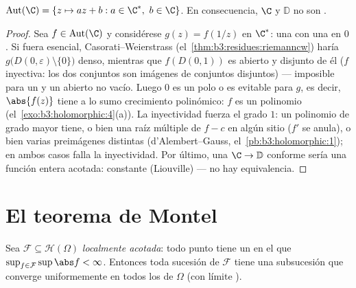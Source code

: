 \begin{theorem}
\label{thm:b3:conformal:autplane}
$\operatorname{Aut}(\C) = \{z \mapsto az + b : a \in \C^*,\ b
\in \C\}$. En consecuencia, $\C$ y $\mathbb D$ no son
.
\end{theorem}

\begin{proof}
Sea $f \in \operatorname{Aut}(\C)$ y considérese $g(z) =
f(1/z)$ en $\C^*$: una  con una  en $0$. Si fuera esencial, Casorati--Weierstrass
(el~\cref{thm:b3:residues:riemanncw}) haría
$g\bigl(D(0,\varepsilon)\setminus\{0\}\bigr)$ denso, mientras que
$f(D(0, 1))$ es abierto y disjunto de él ($f$ inyectiva: los dos
conjuntos son imágenes de conjuntos disjuntos) --- imposible para un
 y un
abierto no vacío. Luego $0$ es un
polo o es evitable para $g$, es decir, $\abs{f(z)}$ tiene a lo sumo
crecimiento polinómico: $f$ es un polinomio
(el~\cref{exo:b3:holomorphic:4}(a)). La inyectividad fuerza el grado
$1$: un polinomio de grado mayor tiene, o bien una raíz múltiple de
$f - c$ en algún sitio ($f'$ se anula), o bien varias preimágenes
distintas (d'Alembert--Gauss, el~\cref{pb:b3:holomorphic:1}); en ambos
casos falla la inyectividad. Por último, una $\C \to
\mathbb D$ conforme sería una función entera acotada: constante
(Liouville) --- no hay equivalencia.
\end{proof}

\section{El teorema de Montel}

\begin{theorem}[Montel]\label{thm:b3:conformal:montel}
Sea $\mathcal F \subseteq \mathcal H(\Omega)$ \emph{localmente acotada}:
todo punto tiene un  en el que
$\sup_{f\in
\mathcal F}\sup\abs f < \infty$. Entonces toda sucesión de $\mathcal F$
tiene una subsucesión que converge uniformemente en todos los
 de $\Omega$ (con límite
).
\end{theorem}

